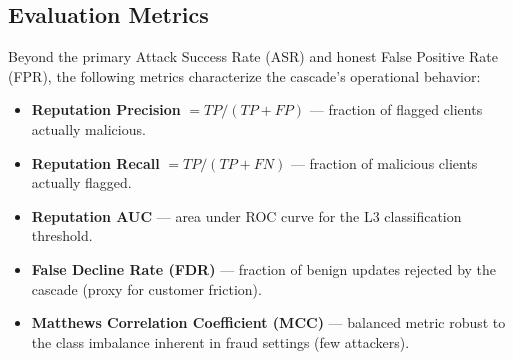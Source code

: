 \documentclass[10pt,journal]{IEEEtran}
\begin{document}
\begin{table}[t]
\centering
\caption{Ablation configurations.}
\label{tab:ablation}
\footnotesize
{}
\end{table}

\subsection{Evaluation Metrics}\label{sec:metrics}

Beyond the primary Attack Success Rate (ASR) and honest False Positive Rate (FPR), the following metrics characterize the cascade's operational behavior:

\begin{itemize}
  \item \textbf{Reputation Precision} $= TP/(TP+FP)$ --- fraction of flagged clients actually malicious.
  \item \textbf{Reputation Recall} $= TP/(TP+FN)$ --- fraction of malicious clients actually flagged.
  \item \textbf{Reputation AUC} --- area under ROC curve for the L3 classification threshold.
  \item \textbf{False Decline Rate (FDR)} --- fraction of benign updates rejected by the cascade (proxy for customer friction).
  \item \textbf{Matthews Correlation Coefficient (MCC)} --- balanced metric robust to the class imbalance inherent in fraud settings (few attackers).
\end{itemize}
\end{document}
